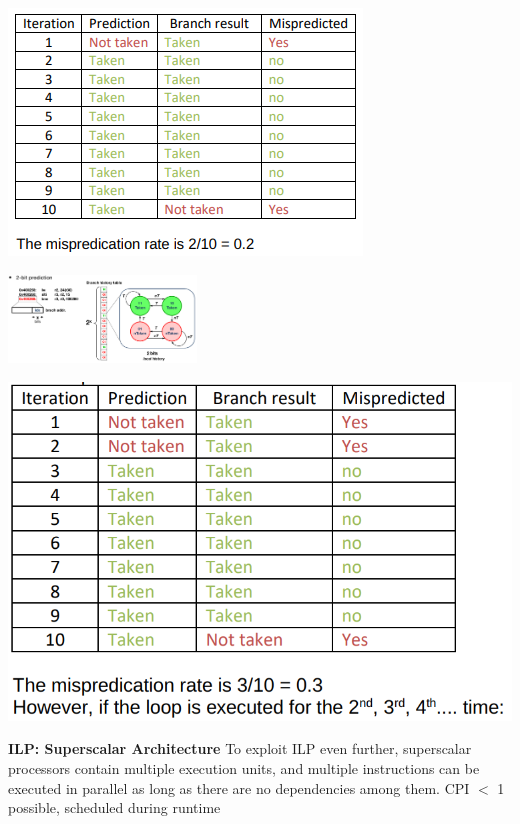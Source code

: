 \documentclass[english]{latex4ei/latex4ei_sheet}
\begin{document}
\begin{center}
  \centering
  \includegraphics[width=0.8\linewidth]{assets/BranchPred1.png}
  \label{fig:branchpred1}
\end{center}

\begin{center}
	\includegraphics[width = 5cm]{images/4.ProcessorArchitecture/2BitPred.png}
\end{center}

\begin{center}
  \centering
  \includegraphics[width=0.8\linewidth]{assets/TwoBitPred.png}
  \label{fig:twobitpred}
\end{center}



\textbf{ILP: Superscalar Architecture} To exploit ILP even further, superscalar processors contain multiple execution units, and multiple instructions can be executed in parallel as long as there are no dependencies among them. CPI $<$ 1 possible, scheduled during runtime
\end{document}
